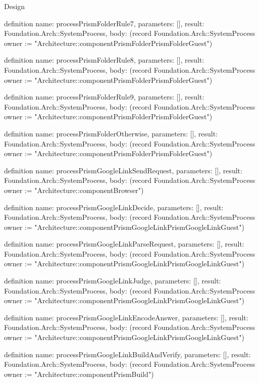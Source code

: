 \begin{lexlean}{Design}
\begin{semanticmodule}
definition{
  name: processPrismFolderRule7,
  parameters: [],
  result: Foundation.Arch::SystemProcess,
  body: (record Foundation.Arch::SystemProcess {owner := "Architecture::componentPrismFolderPrismFolderGuest"})
}

definition{
  name: processPrismFolderRule8,
  parameters: [],
  result: Foundation.Arch::SystemProcess,
  body: (record Foundation.Arch::SystemProcess {owner := "Architecture::componentPrismFolderPrismFolderGuest"})
}

definition{
  name: processPrismFolderRule9,
  parameters: [],
  result: Foundation.Arch::SystemProcess,
  body: (record Foundation.Arch::SystemProcess {owner := "Architecture::componentPrismFolderPrismFolderGuest"})
}

definition{
  name: processPrismFolderOtherwise,
  parameters: [],
  result: Foundation.Arch::SystemProcess,
  body: (record Foundation.Arch::SystemProcess {owner := "Architecture::componentPrismFolderPrismFolderGuest"})
}

definition{
  name: processPrismGoogleLinkSendRequest,
  parameters: [],
  result: Foundation.Arch::SystemProcess,
  body: (record Foundation.Arch::SystemProcess {owner := "Architecture::componentBrowser"})
}

definition{
  name: processPrismGoogleLinkDecide,
  parameters: [],
  result: Foundation.Arch::SystemProcess,
  body: (record Foundation.Arch::SystemProcess {owner := "Architecture::componentPrismGoogleLinkPrismGoogleLinkGuest"})
}

definition{
  name: processPrismGoogleLinkParseRequest,
  parameters: [],
  result: Foundation.Arch::SystemProcess,
  body: (record Foundation.Arch::SystemProcess {owner := "Architecture::componentPrismGoogleLinkPrismGoogleLinkGuest"})
}

definition{
  name: processPrismGoogleLinkJudge,
  parameters: [],
  result: Foundation.Arch::SystemProcess,
  body: (record Foundation.Arch::SystemProcess {owner := "Architecture::componentPrismGoogleLinkPrismGoogleLinkGuest"})
}

definition{
  name: processPrismGoogleLinkEncodeAnswer,
  parameters: [],
  result: Foundation.Arch::SystemProcess,
  body: (record Foundation.Arch::SystemProcess {owner := "Architecture::componentPrismGoogleLinkPrismGoogleLinkGuest"})
}

definition{
  name: processPrismGoogleLinkBuildAndVerify,
  parameters: [],
  result: Foundation.Arch::SystemProcess,
  body: (record Foundation.Arch::SystemProcess {owner := "Architecture::componentPrismBuild"})
}


\end{semanticmodule}
\end{lexlean}
